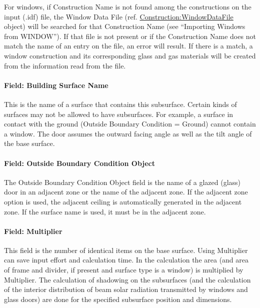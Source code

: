 For windows, if Construction Name is not found among the constructions on the input (.idf) file, the Window Data File (ref. \hyperref[constructionwindowdatafile]{Construction:WindowDataFile} object) will be searched for that Construction Name (see ``Importing Windows from WINDOW''). If that file is not present or if the Construction Name does not match the name of an entry on the file, an error will result. If there is a match, a window construction and its corresponding glass and gas materials will be created from the information read from the file.

\paragraph{Field: Building Surface Name}\label{field-building-surface-name-5}

This is the name of a surface that contains this subsurface. Certain kinds of surfaces may not be allowed to have subsurfaces. For example, a surface in contact with the ground (Outside Boundary Condition = Ground) cannot contain a window. The door assumes the outward facing angle as well as the tilt angle of the base surface.

\paragraph{Field: Outside Boundary Condition Object}\label{field-outside-boundary-condition-object-5}

The Outside Boundary Condition Object field is the name of a glazed (glass) door in an adjacent zone or the name of the adjacent zone. If the adjacent zone option is used, the adjacent ceiling is automatically generated in the adjacent zone. If the surface name is used, it must be in the adjacent zone.

\paragraph{Field: Multiplier}\label{field-multiplier-6}

This field is the number of identical items on the base surface. Using Multiplier can save input effort and calculation time. In the calculation the area (and area of frame and divider, if present and surface type is a window) is multiplied by Multiplier. The calculation of shadowing on the subsurfaces (and the calculation of the interior distribution of beam solar radiation transmitted by windows and glass doors) are done for the specified subsurface position and dimensions.

